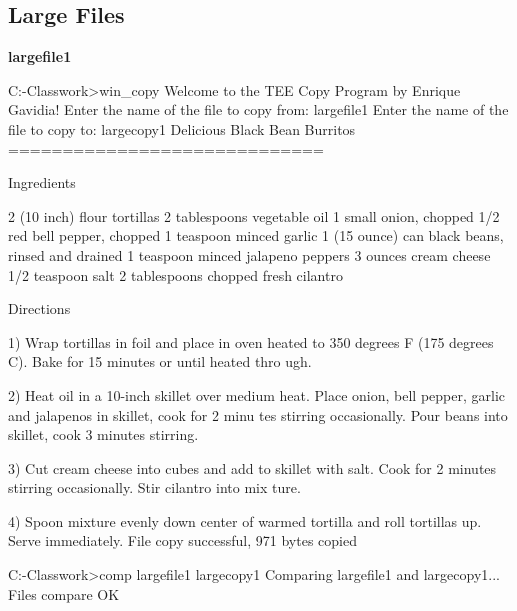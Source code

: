 \documentclass[12pt]{article}
\newcommand {\filename}[1] {\flushleft \textbf{#1}}
\begin{document}
\subsection*{Large Files}

\filename{largefile1}
\begin{shelloutput}
C:\Users\Enrique\School\OS-Classwork>win_copy
Welcome to the TEE Copy Program by Enrique Gavidia!
Enter the name of the file to copy from:
largefile1
Enter the name of the file to copy to:
largecopy1
Delicious Black Bean Burritos
=============================

Ingredients

2 (10 inch) flour tortillas
2 tablespoons vegetable oil
1 small onion, chopped
1/2 red bell pepper, chopped
1 teaspoon minced garlic
1 (15 ounce) can black beans, rinsed and drained
1 teaspoon minced jalapeno peppers
3 ounces cream cheese
1/2 teaspoon salt
2 tablespoons chopped fresh cilantro


Directions

1) Wrap tortillas in foil and place in oven heated to 350 degrees F (175 degrees C). Bake for 15 minutes or until heated thro
ugh.

2) Heat oil in a 10-inch skillet over medium heat. Place onion, bell pepper, garlic and jalapenos in skillet, cook for 2 minu
tes
stirring occasionally. Pour beans into skillet, cook 3 minutes stirring.

3) Cut cream cheese into cubes and add to skillet with salt. Cook for 2 minutes stirring occasionally. Stir cilantro into mix
ture.

4) Spoon mixture evenly down center of warmed tortilla and roll tortillas up. Serve immediately.
File copy successful, 971 bytes copied

C:\Users\Enrique\School\OS-Classwork>comp largefile1 largecopy1
Comparing largefile1 and largecopy1...
Files compare OK

\end{shelloutput}
\end{document}
